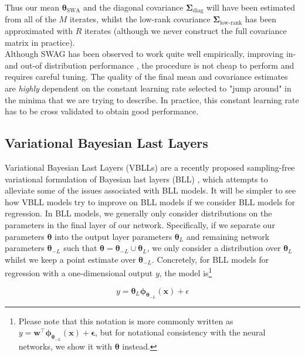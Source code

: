 \noindent Thus our mean $\bm{\theta}_{\text{SWA}}$ and the diagonal covariance $\bm{\Sigma}_{\text{diag}}$ will have been estimated from all of the $M$ iterates, whilst the low-rank covariance $\bm{\Sigma}_{\text{low-rank}}$ has been approximated with $R$ iterates (although we never construct the full covariance matrix in practice). \\

\noindent Although SWAG has been observed to work quite well empirically, improving in- and out-of distribution performance \citep{2019_SWAG, 2020_MultiSWAG, dhahri2024shavingweightsoccamsrazor}, the procedure is not cheap to perform and requires careful tuning. The quality of the final mean and covariance estimates are \textit{highly} dependent on the constant learning rate selected to "jump around" in the minima that we are trying to describe. In practice, this constant learning rate has to be cross validated to obtain good performance.

\subsection{Variational Bayesian Last Layers}
\label{sec:VBLL}
Variational Bayesian Last Layers (VBLLs) \citep{2024_VBLL} are a recently proposed sampling-free variational formulation of Bayesian last layers (BLL) \citep{2015_BLL}, which attempts to alleviate some of the issues associated with BLL models. It will be simpler to see how VBLL models try to improve on BLL models if we consider BLL models for regression. In BLL models, we generally only consider distributions on the parameters in the final layer of our network. Specifically, if we separate our parameters $\bm{\theta}$ into the output layer parameters $\bm{\theta}_L$ and remaining network parameters $\bm{\theta}_{-L}$ such that $\bm{\theta}=\bm{\theta}_{-L}\cup\bm{\theta}_{L}$, we only consider a distribution over $\bm{\theta}_L$ whilst we keep a point estimate over $\bm{\theta}_{-L}$. Concretely, for BLL models for regression with a one-dimensional output $y$, the model is\footnote{Please note that this notation is more commonly written as $y = \mathbf{w}^\top\bm\phi_{ \bm{\theta}_{-L}}(\mathbf{x})+\mathbf{\epsilon}$, but for notational consistency with the neural networks, we show it with $\bm{\theta}$ instead.}

\begin{equation}
    y = \bm{\theta}_L\bm\phi_{\bm{\theta}_{-L}}(\mathbf{x}) + \epsilon
\end{equation}


